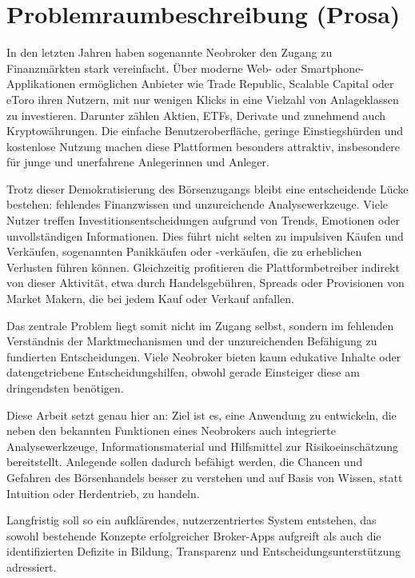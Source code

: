 \documentclass{article}
\begin{document}
\section{Problemraumbeschreibung (Prosa)}
\begin{center}
In den letzten Jahren haben sogenannte Neobroker den Zugang zu Finanzmärkten stark vereinfacht. Über moderne Web- oder Smartphone-Applikationen ermöglichen Anbieter wie Trade Republic, Scalable Capital oder eToro ihren Nutzern, mit nur wenigen Klicks in eine Vielzahl von Anlageklassen zu investieren. Darunter zählen Aktien, ETFs, Derivate und zunehmend auch Kryptowährungen. Die einfache Benutzeroberfläche, geringe Einstiegshürden und kostenlose Nutzung machen diese Plattformen besonders attraktiv, insbesondere für junge und unerfahrene Anlegerinnen und Anleger.

Trotz dieser Demokratisierung des Börsenzugangs bleibt eine entscheidende Lücke bestehen: fehlendes Finanzwissen und unzureichende Analysewerkzeuge. Viele Nutzer treffen Investitionsentscheidungen aufgrund von Trends, Emotionen oder unvollständigen Informationen. Dies führt nicht selten zu impulsiven Käufen und Verkäufen, sogenannten Panikkäufen oder -verkäufen, die zu erheblichen Verlusten führen können. Gleichzeitig profitieren die Plattformbetreiber indirekt von dieser Aktivität, etwa durch Handelsgebühren, Spreads oder Provisionen von Market Makern, die bei jedem Kauf oder Verkauf anfallen.

Das zentrale Problem liegt somit nicht im Zugang selbst, sondern im fehlenden Verständnis der Marktmechanismen und der unzureichenden Befähigung zu fundierten Entscheidungen. Viele Neobroker bieten kaum edukative Inhalte oder datengetriebene Entscheidungshilfen, obwohl gerade Einsteiger diese am dringendsten benötigen.

Diese Arbeit setzt genau hier an:
Ziel ist es, eine Anwendung zu entwickeln, die neben den bekannten Funktionen eines Neobrokers auch integrierte Analysewerkzeuge, Informationsmaterial und Hilfsmittel zur Risikoeinschätzung bereitstellt. Anlegende sollen dadurch befähigt werden, die Chancen und Gefahren des Börsenhandels besser zu verstehen und auf Basis von Wissen, statt Intuition oder Herdentrieb, zu handeln.

Langfristig soll so ein aufklärendes, nutzerzentriertes System entstehen, das sowohl bestehende Konzepte erfolgreicher Broker-Apps aufgreift als auch die identifizierten Defizite in Bildung, Transparenz und Entscheidungsunterstützung adressiert.
\end{center}
\newpage
\end{document}

